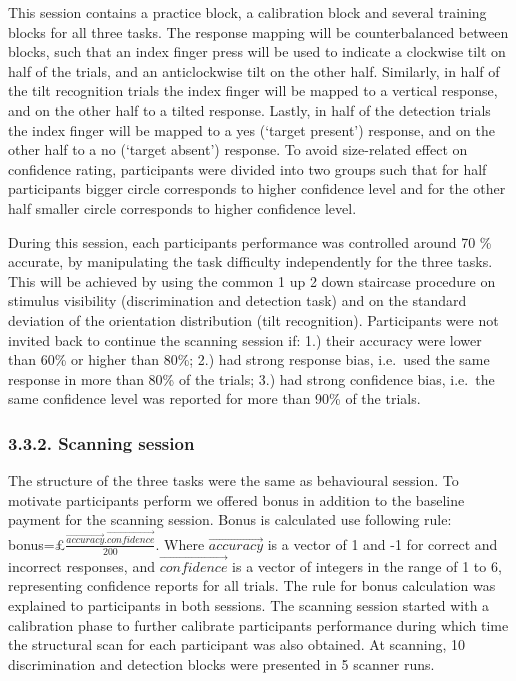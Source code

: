 \documentclass[
]{article}
\begin{document}
This session contains a practice block, a calibration block and several
training blocks for all three tasks. The response mapping will be
counterbalanced between blocks, such that an index finger press will be
used to indicate a clockwise tilt on half of the trials, and an
anticlockwise tilt on the other half. Similarly, in half of the tilt
recognition trials the index finger will be mapped to a vertical
response, and on the other half to a tilted response. Lastly, in half of
the detection trials the index finger will be mapped to a yes (`target
present') response, and on the other half to a no (`target absent')
response. To avoid size-related effect on confidence rating,
participants were divided into two groups such that for half
participants bigger circle corresponds to higher confidence level and
for the other half smaller circle corresponds to higher confidence
level.

During this session, each participants performance was controlled around
70 \% accurate, by manipulating the task difficulty independently for
the three tasks. This will be achieved by using the common 1 up 2 down
staircase procedure on stimulus visibility (discrimination and detection
task) and on the standard deviation of the orientation distribution
(tilt recognition). Participants were not invited back to continue the
scanning session if: 1.) their accuracy were lower than 60\% or higher
than 80\%; 2.) had strong response bias, i.e.~used the same response in
more than 80\% of the trials; 3.) had strong confidence bias, i.e.~the
same confidence level was reported for more than 90\% of the trials.

\hypertarget{scanning-session}{%
\subsubsection{3.3.2. Scanning session}\label{scanning-session}}

The structure of the three tasks were the same as behavioural session.
To motivate participants perform we offered bonus in addition to the
baseline payment for the scanning session. Bonus is calculated use
following rule:\\
bonus=£\(\frac{\overrightarrow{accuracy}.\overrightarrow{confidence}}{200}\).
Where \(\overrightarrow{accuracy}\) is a vector of 1 and -1 for correct
and incorrect responses, and \(\overrightarrow{confidence}\) is a vector
of integers in the range of 1 to 6, representing confidence reports for
all trials. The rule for bonus calculation was explained to participants
in both sessions. The scanning session started with a calibration phase
to further calibrate participants performance during which time the
structural scan for each participant was also obtained. At scanning, 10
discrimination and detection blocks were presented in 5 scanner runs.
\end{document}
